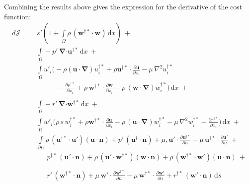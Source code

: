 \documentclass[12pt, a4paper]{article}
\begin{document}
    Combining the results above gives the expression for the derivative of the cost function:
    \begin{equation}
    \begin{split}
        d \mathcal{J} = \ &
            s' \left( 1 + 
        \int\limits_{\Omega} \rho \, (\mathbf{w^{\dagger *} \cdot w}) 
        \, \mathrm{d} x
        \right) \ + \\
        &\int\limits_{\Omega}
            -p' \, \boldsymbol{\nabla} \mathbf{\cdot u^{\dagger *}}
        \, \mathrm{d} x \ + \\
        &\int\limits_{\Omega} u'_i \bigg( 
            - \rho (\mathbf{u \cdot} \boldsymbol{\nabla}) u^{\dagger*}_i + 
            \rho \mathbf{u^{\dagger*} \cdot} \frac{\partial \mathbf{u}}{\partial x_i} - 
            \mu \, \nabla^2 u^{\dagger*}_i \\ 
        & \phantom{\int\limits_{\Omega} u'_i \bigg( \ }
            - \frac{\partial p^{\dagger*}}{\partial x_i} + 
            \rho \, \mathbf{w^{\dagger*} \cdot} \frac{\partial \mathbf{w}}{\partial x_i} - 
            \rho \, (\mathbf{w \cdot} \boldsymbol{\nabla}) w^{\dagger*}_i
        \bigg) \, \mathrm{d} x \ + \\
        &\int\limits_{\Omega}
            -r' \, \boldsymbol{\nabla} \mathbf{\cdot w^{\dagger *}}
        \, \mathrm{d} x \ + \\
        &\int\limits_{\Omega} w'_i \bigg( 
            \rho \, s \, w^{\dagger*}_i + 
            \rho \mathbf{w^{\dagger*} \cdot} \frac{\partial \mathbf{u}}{\partial x_i} - 
            \rho \, (\mathbf{u \cdot} \boldsymbol{\nabla}) w^{\dagger*}_i - 
            \mu \, \nabla^2 w^{\dagger*}_i - 
            \frac{\partial r^{\dagger*}}{\partial x_i}
        \bigg) \, \mathrm{d} x \ + \\
        &\int\limits_{\partial \Omega}
            \rho \, (\mathbf{u^{\dagger*} \cdot u'}) (\mathbf{u \cdot n}) + 
            p' \, (\mathbf{u^{\dagger} \cdot n}) + 
            \mu, \mathbf{u' \cdot} \frac{\partial \mathbf{u^{\dagger*}}}{\partial n} - 
            \mu \, \mathbf{u^{\dagger*} \cdot} \frac{\partial \mathbf{u'}}{\partial n} \ + \\
        &\phantom{\int\limits_{\partial \Omega} \ }
            p^{\dagger*} \, (\mathbf{u' \cdot n}) + 
            \rho \, (\mathbf{u' \cdot w^{\dagger*}}) (\mathbf{w \cdot n}) + 
            \rho \, (\mathbf{w^{\dagger*} \cdot w'}) (\mathbf{u \cdot n}) \ + \\
        &\phantom{\int\limits_{\partial \Omega} \ }
            r' \, (\mathbf{w^{\dagger*} \cdot n}) + 
            \mu \, \mathbf{w' \cdot} \frac{\partial \mathbf{w^{\dagger*}}}{\partial n} - 
            \mu \, \mathbf{w^{\dagger*} \cdot} \frac{\partial \mathbf{w'}}{\partial n} + 
            r^{\dagger*} \, (\mathbf{w' \cdot n})
        \, \mathrm{d} s
    \end{split}
    \end{equation}
    
\end{document}
